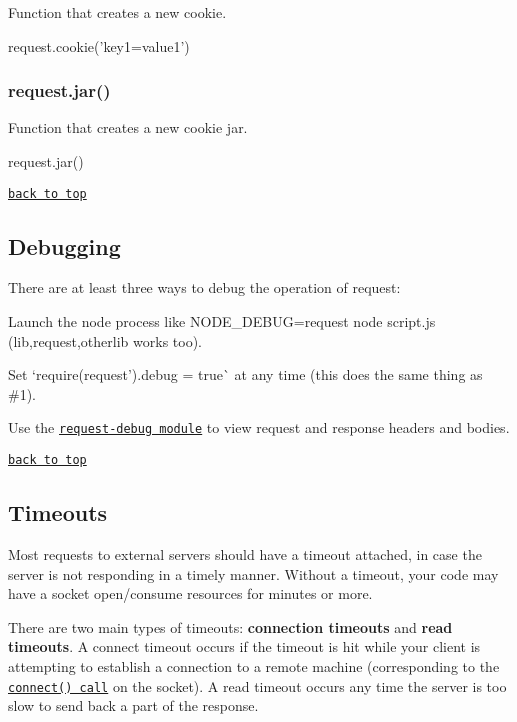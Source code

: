 Function that creates a new cookie.


\begin{DoxyCode}
request.cookie('key1=value1')
\end{DoxyCode}
 \subsubsection*{request.\+jar()}

Function that creates a new cookie jar.


\begin{DoxyCode}
request.jar()
\end{DoxyCode}


\href{#table-of-contents}{\tt back to top}





\subsection*{Debugging}

There are at least three ways to debug the operation of {\ttfamily request}\+:


\begin{DoxyEnumerate}
\item Launch the node process like {\ttfamily N\+O\+D\+E\+\_\+\+D\+E\+B\+UG=request node script.\+js} ({\ttfamily lib,request,otherlib} works too).
\item Set `require(\textquotesingle{}request').debug = true\`{} at any time (this does the same thing as \#1).
\item Use the \href{https://github.com/request/request-debug}{\tt request-\/debug module} to view request and response headers and bodies.
\end{DoxyEnumerate}

\href{#table-of-contents}{\tt back to top}





\subsection*{Timeouts}

Most requests to external servers should have a timeout attached, in case the server is not responding in a timely manner. Without a timeout, your code may have a socket open/consume resources for minutes or more.

There are two main types of timeouts\+: {\bfseries connection timeouts} and {\bfseries read timeouts}. A connect timeout occurs if the timeout is hit while your client is attempting to establish a connection to a remote machine (corresponding to the \href{http://linux.die.net/man/2/connect}{\tt connect() call} on the socket). A read timeout occurs any time the server is too slow to send back a part of the response.


